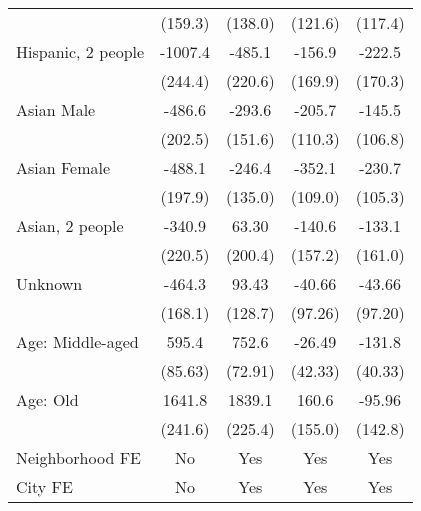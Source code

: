 {\begin{longtable}{l*{4}{c}}
                    &     (159.3)         &     (138.0)         &     (121.6)         &     (117.4)         \\
[1em]
Hispanic, 2 people &     -1007.4\sym{***}&      -485.1\sym{*}  &      -156.9         &      -222.5         \\
                    &     (244.4)         &     (220.6)         &     (169.9)         &     (170.3)         \\
[1em]
Asian Male          &      -486.6\sym{*}  &      -293.6         &      -205.7         &      -145.5         \\
                    &     (202.5)         &     (151.6)         &     (110.3)         &     (106.8)         \\
[1em]
Asian Female        &      -488.1\sym{*}  &      -246.4         &      -352.1\sym{**} &      -230.7\sym{*}  \\
                    &     (197.9)         &     (135.0)         &     (109.0)         &     (105.3)         \\
[1em]
Asian, 2 people    &      -340.9         &       63.30         &      -140.6         &      -133.1         \\
                    &     (220.5)         &     (200.4)         &     (157.2)         &     (161.0)         \\
[1em]
Unknown             &      -464.3\sym{**} &       93.43         &      -40.66         &      -43.66         \\
                    &     (168.1)         &     (128.7)         &     (97.26)         &     (97.20)         \\
[1em]
Age: Middle-aged         &       595.4\sym{***}&       752.6\sym{***}&      -26.49         &      -131.8\sym{**} \\
                    &     (85.63)         &     (72.91)         &     (42.33)         &     (40.33)         \\
[1em]
Age: Old           &      1641.8\sym{***}&      1839.1\sym{***}&       160.6         &      -95.96         \\
                    &     (241.6)         &     (225.4)         &     (155.0)         &     (142.8)         \\
[1em]
Neighborhood FE        &           No          &           Yes         &           Yes         &           Yes         \\
[1em]
City FE       &          No           &       Yes         &       Yes &     Yes \\

\end{longtable}}
